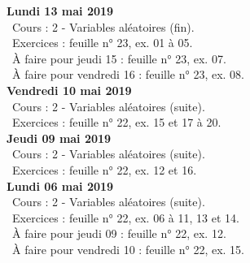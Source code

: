 \documentclass[12pt,a4paper]{article}
\begin{document}
% 
% 

\noindent\textbf{Lundi 13 mai 2019}\\
\bu\ Cours : 2 - Variables aléatoires (fin).\\
\bu\ Exercices : feuille n° 23, ex. 01 à 05.\\
\bu\ À faire pour jeudi 15 : feuille n° 23, ex. 07.\\
\bu\ À faire pour vendredi 16 : feuille n° 23, ex. 08.\vspace{.4cm}\\

\noindent\textbf{Vendredi 10 mai 2019}\\
\bu\ Cours : 2 - Variables aléatoires (suite).\\
\bu\ Exercices : feuille n° 22, ex. 15 et 17 à 20.\vspace{.4cm}\\

\noindent\textbf{Jeudi 09 mai 2019}\\
\bu\ Cours : 2 - Variables aléatoires (suite).\\
\bu\ Exercices : feuille n° 22, ex. 12 et 16.\vspace{.4cm}\\

\noindent\textbf{Lundi 06 mai 2019}\\
\bu\ Cours : 2 - Variables aléatoires (suite).\\
\bu\ Exercices : feuille n° 22, ex. 06 à 11, 13 et 14.\\
\bu\ À faire pour jeudi 09 : feuille n° 22, ex. 12.\\
\bu\ À faire pour vendredi 10 : feuille n° 22, ex. 15.\vspace{.4cm}\\
\end{document}
